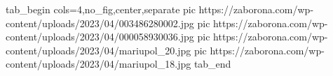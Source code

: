  
 
 
 
 

\ifcmt
  tab_begin cols=4,no_fig,center,separate
     pic https://zaborona.com/wp-content/uploads/2023/04/003486280002.jpg
		 pic https://zaborona.com/wp-content/uploads/2023/04/000058930036.jpg
		 pic https://zaborona.com/wp-content/uploads/2023/04/mariupol_20.jpg
		 pic https://zaborona.com/wp-content/uploads/2023/04/mariupol_18.jpg
  tab_end
\fi
